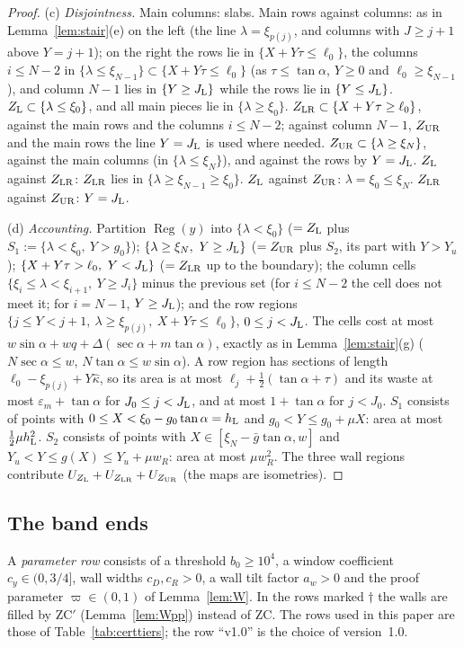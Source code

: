 \documentclass[11pt]{amsart}
\newcommand{\Reg}{\operatorname{Reg}}
\newcommand{\sa}{\sin\alpha}
\newcommand{\ta}{\tan\alpha}
\newcommand{\se}{\sec\alpha}
\theoremstyle{definition}
\theoremstyle{remark}
\numberwithin{equation}{section}
\begin{document}
\begin{proof}
(c) \emph{Disjointness.} Main columns: slabs. Main rows against columns: as in Lemma~\ref{lem:stair}(e) on the left (the
line $\lambda=\xi_{p(j)}$, and columns with $J\ge j+1$ above $Y=j+1$); on the right the rows lie in
$\{X+Y\tau\le\ell_0\}$, the columns $i\le N-2$ in $\{\lambda\le\xi_{N-1}\}\subset\{X+Y\tau\le\ell_0\}$ (as $\tau\le\ta$,
$Y\ge0$ and $\ell_0\ge\xi_{N-1}$), and column $N-1$ lies in $\{Y\ge J_{\rm L}\}$ while the rows lie in $\{Y\le J_{\rm L}\}$.
$Z_{\rm L}\subset\{\lambda\le\xi_0\}$, and all main pieces lie in $\{\lambda\ge\xi_0\}$. $Z_{\rm LR}\subset\{X+Y\tau\ge
\ell_0\}$, against the main rows and the columns $i\le N-2$; against column $N-1$, $Z_{\rm UR}$ and the main rows the line
$Y=J_{\rm L}$ is used where needed. $Z_{\rm UR}\subset\{\lambda\ge\xi_N\}$, against the main columns (in
$\{\lambda\le\xi_N\}$), and against the rows by $Y=J_{\rm L}$. $Z_{\rm L}$ against $Z_{\rm LR}$: $Z_{\rm LR}$ lies in
$\{\lambda\ge\xi_{N-1}\ge\xi_0\}$. $Z_{\rm L}$ against $Z_{\rm UR}$: $\lambda=\xi_0\le\xi_N$. $Z_{\rm LR}$ against
$Z_{\rm UR}$: $Y=J_{\rm L}$.

(d) \emph{Accounting.} Partition $\Reg(y)$ into $\{\lambda<\xi_0\}$ ($=Z_{\rm L}$ plus
$S_1:=\{\lambda<\xi_0,\ Y>g_0\}$); $\{\lambda\ge\xi_N,\ Y\ge J_{\rm L}\}$ ($=Z_{\rm UR}$ plus $S_2$, its part with
$Y>Y_u$); $\{X+Y\tau>\ell_0,\ Y<J_{\rm L}\}$ ($=Z_{\rm LR}$ up to the boundary); the column cells
$\{\xi_i\le\lambda<\xi_{i+1},\ Y\ge J_i\}$ minus the previous set (for $i\le N-2$ the cell does not meet it; for $i=N-1$,
$Y\ge J_{\rm L}$); and the row regions $\{j\le Y<j+1,\ \lambda\ge\xi_{p(j)},\ X+Y\tau\le\ell_0\}$, $0\le j<J_{\rm L}$. The
cells cost at most $w\sa+wq+\Delta(\se+m\ta)$, exactly as in Lemma~\ref{lem:stair}(g) ($N\se\le w$, $N\ta\le w\sa$). A row
region has sections of length $\ell_0-\xi_{p(j)}+Y\hat\kappa$, so its area is at most $\ell_j+\frac12(\ta+\tau)$ and its
waste at most $\varepsilon_m+\ta$ for $J_0\le j<J_{\rm L}$, and at most $1+\ta$ for $j<J_0$. $S_1$ consists of points with
$0\le X<\xi_0-g_0\ta=h_{\rm L}$ and $g_0<Y\le g_0+\mu X$: area at most $\frac12\mu h_{\rm L}^2$. $S_2$ consists of points with
$X\in[\xi_N-\bar g\ta,w]$ and $Y_u<Y\le g(X)\le Y_u+\mu w_R$: area at most $\mu w_R^2$. The three wall regions contribute
$U_{Z_{\rm L}}+U_{Z_{\rm LR}}+U_{Z_{\rm UR}}$ (the maps are isometries).
\end{proof}

\subsection{The band ends}\label{ssec:b35}
A \emph{parameter row} consists of a threshold $b_0\ge10^4$, a window coefficient $c_y\in(0,3/4]$, wall widths
$c_D,c_R>0$, a wall tilt factor $a_w>0$ and the proof parameter $\varpi\in(0,1)$ of Lemma~\ref{lem:W}.
In the rows marked $\dagger$ the walls are filled by ZC$'$ (Lemma~\ref{lem:Wpp}) instead of ZC.
The rows used in this paper are those of Table~\ref{tab:certtiers}; the row ``v1.0'' is the choice of version~1.0.
\end{document}
